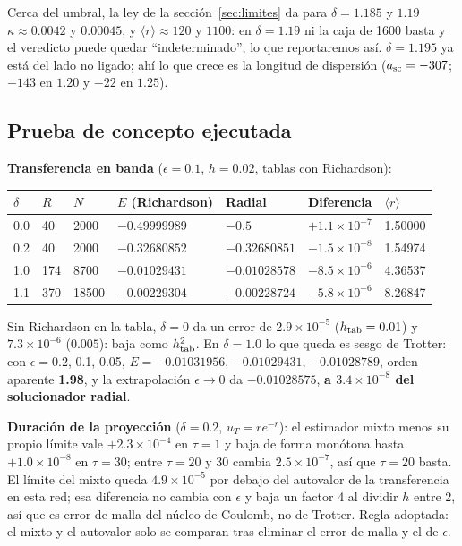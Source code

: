 \documentclass[11pt]{article}
\begin{document}
Cerca del umbral, la ley de la sección~\ref{sec:limites} da para $\delta=1.185$ y $1.19$ $\kappa\approx0.0042$ y $0.00045$, y $\langle r\rangle\approx120$ y $1100$: en $\delta=1.19$ ni la caja de 1600 basta y el veredicto puede quedar ``indeterminado'', lo que reportaremos así. $\delta=1.195$ ya está del lado no ligado; ahí lo que crece es la longitud de dispersión ($a_{\rm sc}=-307$; $-143$ en $1.20$ y $-22$ en $1.25$).

\subsection{Prueba de concepto ejecutada}

\textbf{Transferencia en banda} ($\epsilon=0.1$, $h=0.02$, tablas con Richardson):

\begin{table}[H]
\centering
\small
\begin{tabular}{@{}lllllll@{}}
\toprule
$\delta$ & $R$ & $N$ & $E$ (Richardson) & Radial & Diferencia & $\langle r\rangle$\\
\midrule
0.0 & 40 & 2000 & $-0.49999989$ & $-0.5$ & $+1.1\times10^{-7}$ & 1.50000\\
0.2 & 40 & 2000 & $-0.32680852$ & $-0.32680851$ & $-1.5\times10^{-8}$ & 1.54974\\
1.0 & 174 & 8700 & $-0.01029431$ & $-0.01028578$ & $-8.5\times10^{-6}$ & 4.36537\\
1.1 & 370 & 18500 & $-0.00229304$ & $-0.00228724$ & $-5.8\times10^{-6}$ & 8.26847\\
\bottomrule
\end{tabular}
\end{table}

Sin Richardson en la tabla, $\delta=0$ da un error de $2.9\times10^{-5}$ ($h_{\rm tab}=0.01$) y $7.3\times10^{-6}$ ($0.005$): baja como $h_{\rm tab}^2$. En $\delta=1.0$ lo que queda es sesgo de Trotter: con $\epsilon=0.2$, 0.1, 0.05, $E=-0.01031956$, $-0.01029431$, $-0.01028789$, orden aparente \textbf{1.98}, y la extrapolación $\epsilon\to0$ da $-0.01028575$, \textbf{a $3.4\times10^{-8}$ del solucionador radial}.

\textbf{Duración de la proyección} ($\delta=0.2$, $u_T=re^{-r}$): el estimador mixto menos su propio límite vale $+2.3\times10^{-4}$ en $\tau=1$ y baja de forma monótona hasta $+1.0\times10^{-8}$ en $\tau=30$; entre $\tau=20$ y 30 cambia $2.5\times10^{-7}$, así que $\tau=20$ basta. El límite del mixto queda $4.9\times10^{-5}$ por debajo del autovalor de la transferencia en esta red; esa diferencia no cambia con $\epsilon$ y baja un factor 4 al dividir $h$ entre 2, así que es error de malla del núcleo de Coulomb, no de Trotter. Regla adoptada: el mixto y el autovalor solo se comparan tras eliminar el error de malla y el de $\epsilon$.
\end{document}
